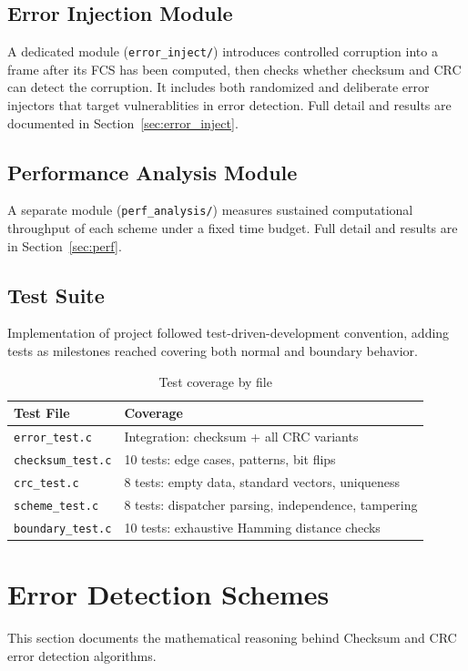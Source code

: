 \documentclass[10pt]{article}
\begin{document}
\subsection{Error Injection Module}

A dedicated module (\texttt{error\_inject/}) introduces controlled
corruption into a frame after its FCS has been computed, then checks
whether checksum and CRC can detect the corruption. It includes both randomized and deliberate error injectors that target vulnerablities in error detection. Full detail and results are documented in Section~\ref{sec:error_inject}.

\subsection{Performance Analysis Module}

A separate module (\texttt{perf\_analysis/}) measures sustained
computational throughput of each scheme under a fixed time budget.
Full detail and results are in Section~\ref{sec:perf}.

\subsection{Test Suite}

Implementation of project followed test-driven-development convention, adding tests as milestones reached covering
both normal and boundary behavior.

\begin{table}[H]
\centering
\begin{tabular}{ll}
\toprule
Test File & Coverage \\
\midrule
\texttt{error\_test.c} & Integration: checksum + all CRC variants \\
\texttt{checksum\_test.c} & 10 tests: edge cases, patterns, bit flips \\
\texttt{crc\_test.c} & 8 tests: empty data, standard vectors, uniqueness \\
\texttt{scheme\_test.c} & 8 tests: dispatcher parsing, independence, tampering \\
\texttt{boundary\_test.c} & 10 tests: exhaustive Hamming distance checks \\
\bottomrule
\end{tabular}
\caption{Test coverage by file}
\end{table}

\section{Error Detection Schemes}\label{sec:error}
This section documents the mathematical reasoning behind Checksum and CRC error detection algorithms. 
\end{document}
